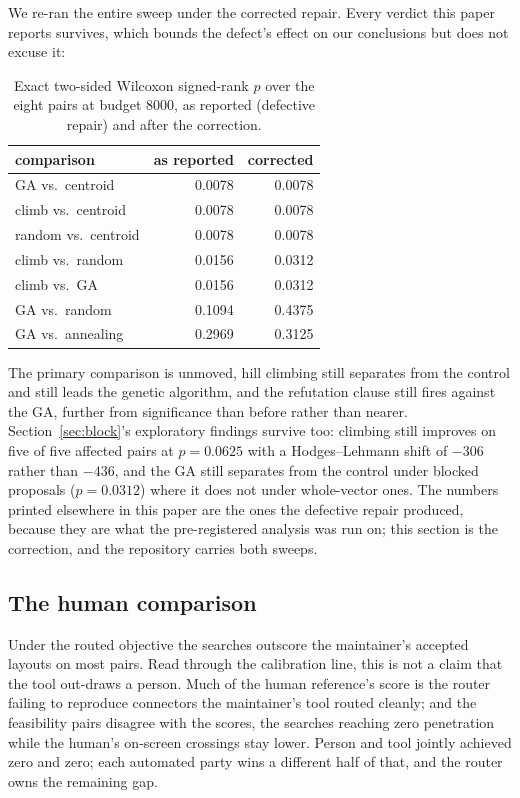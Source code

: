 \documentclass[11pt]{article}
\begin{document}
We re-ran the entire sweep under the corrected repair. Every verdict this paper reports
survives, which bounds the defect's effect on our conclusions but does not excuse it:

\begin{table}[h]
\centering
\caption{Exact two-sided Wilcoxon signed-rank $p$ over the eight pairs at budget 8000, as
reported (defective repair) and after the correction.}
\label{tab:repair}
\begin{tabular}{lrr}
\toprule
comparison & as reported & corrected \\
\midrule
GA vs.\ centroid      & 0.0078 & 0.0078 \\
climb vs.\ centroid   & 0.0078 & 0.0078 \\
random vs.\ centroid  & 0.0078 & 0.0078 \\
climb vs.\ random     & 0.0156 & 0.0312 \\
climb vs.\ GA         & 0.0156 & 0.0312 \\
GA vs.\ random        & 0.1094 & 0.4375 \\
GA vs.\ annealing     & 0.2969 & 0.3125 \\
\bottomrule
\end{tabular}
\end{table}

The primary comparison is unmoved, hill climbing still separates from the control and still
leads the genetic algorithm, and the refutation clause still fires against the GA, further
from significance than before rather than nearer. Section~\ref{sec:block}'s exploratory
findings survive too: climbing still improves on five of five affected pairs at
$p = 0.0625$ with a Hodges--Lehmann shift of $-306$ rather than $-436$, and the GA still
separates from the control under blocked proposals ($p = 0.0312$) where it does not under
whole-vector ones. The numbers printed elsewhere in this paper are the ones the defective
repair produced, because they are what the pre-registered analysis was run on; this section
is the correction, and the repository carries both sweeps.

\subsection{The human comparison}\label{sec:human}

Under the routed objective the searches outscore the maintainer's accepted layouts on most
pairs. Read through the calibration line, this is not a claim that the tool out-draws a
person. Much of the human reference's score is the router failing to reproduce connectors
the maintainer's tool routed cleanly; and the feasibility pairs disagree with the scores,
the searches reaching zero penetration while the human's on-screen crossings stay lower.
Person and tool jointly achieved zero and zero; each automated party wins a different half
of that, and the router owns the remaining gap.
\end{document}
